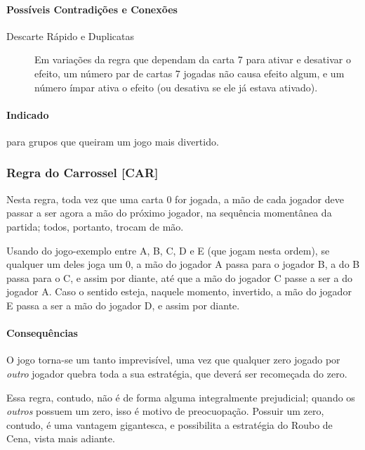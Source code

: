 \paragraph{Possíveis Contradições e Conexões}

\begin{description}
\item[Descarte Rápido e Duplicatas]{Em variações da regra que dependam da carta 7 para ativar e desativar o efeito, um número par de cartas 7 jogadas não causa efeito algum, e um número ímpar ativa o efeito (ou desativa se ele já estava ativado).}
\end{description}

\paragraph{Indicado}

para grupos que queiram um jogo mais divertido.

\subsubsection{Regra do Carrossel [CAR]}

Nesta regra, toda vez que uma carta 0 for jogada, a mão de cada jogador deve passar a ser agora a mão do próximo jogador, na sequência momentânea da partida; todos, portanto, trocam de mão.

Usando do jogo-exemplo entre A, B, C, D e E (que jogam nesta ordem), se qualquer um deles joga um 0, a mão do jogador A passa para o jogador B, a do B passa para o C, e assim por diante, até que a mão do jogador C passe a ser a do jogador A. Caso o sentido esteja, naquele momento, invertido, a mão do jogador E passa a ser a mão do jogador D, e assim por diante.

\paragraph{Consequências}

O jogo torna-se um tanto imprevisível, uma vez que qualquer zero jogado por \textit{outro} jogador quebra toda a sua estratégia, que deverá ser recomeçada do zero.

Essa regra, contudo, não é de forma alguma integralmente prejudicial; quando os \emph{outros} possuem um zero, isso é motivo de preocuopação. Possuir um zero, contudo, é uma vantagem gigantesca, e possibilita a estratégia do Roubo de Cena, vista mais adiante.

